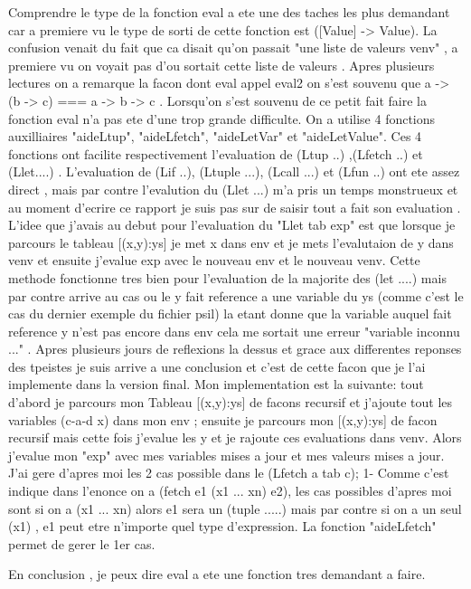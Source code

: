 \documentclass{article}
\begin{document}
Comprendre le type de la fonction eval a ete une des taches les plus demandant car a premiere vu le type de sorti de cette fonction est ([Value] -> Value). La confusion venait du fait que ca disait qu'on passait "une liste de valeurs venv" , a premiere vu on voyait pas d'ou sortait cette liste de valeurs . Apres plusieurs lectures on a remarque la facon dont eval appel eval2  on s'est souvenu que  a -> (b -> c)  === a -> b -> c . Lorsqu'on s'est souvenu de ce petit fait faire la fonction eval n'a pas ete d'une trop grande difficulte. On a utilise 4 fonctions auxilliaires  "aideLtup", "aideLfetch", "aideLetVar" et "aideLetValue". Ces 4 fonctions ont facilite respectivement l'evaluation de (Ltup ..) ,(Lfetch ..) et (Llet....) . L'evaluation de (Lif ..), (Ltuple ...), (Lcall ...) et (Lfun ..) ont ete assez direct , mais par contre l'evalution du (Llet ...) m'a pris un temps monstrueux et au moment d'ecrire ce rapport je suis pas sur de saisir tout a fait son evaluation . L'idee que j'avais au debut pour l'evaluation du "Llet tab exp" est que lorsque je parcours le tableau [(x,y):ys] je met x dans env et je mets l'evalutaion de y dans venv et ensuite j'evalue exp avec le nouveau env et le nouveau venv. Cette methode fonctionne tres bien pour l'evaluation de la majorite des (let ....) mais par contre arrive au cas ou le y fait reference a une variable du ys (comme c'est le cas du dernier exemple du fichier psil) la etant donne que la variable auquel fait reference y n'est pas encore dans env cela me sortait une erreur "variable inconnu ..." . Apres plusieurs jours de reflexions la dessus et grace aux differentes reponses des tpeistes je suis arrive a une conclusion et c'est de cette facon que je l'ai implemente dans la version final. Mon implementation est la suivante: tout d'abord je parcours mon Tableau [(x,y):ys] de facons recursif et j'ajoute tout les variables (c-a-d x) dans mon env ; ensuite je parcours mon [(x,y):ys] de facon recursif mais cette fois j'evalue les y et je rajoute ces evaluations dans venv. Alors j'evalue mon "exp" avec mes variables mises a jour et mes valeurs mises a jour.  
J'ai gere d'apres moi les 2 cas possible dans le (Lfetch a tab c); 1- Comme c'est indique dans l'enonce on a (fetch e1 (x1 ... xn) e2), les cas possibles d'apres moi sont si on a (x1 ... xn) alors e1 sera un (tuple .....) mais par contre si on a un seul (x1) , e1 peut etre n'importe quel type d'expression. La fonction "aideLfetch" permet de gerer le 1er cas.

En conclusion , je peux dire eval a ete une fonction tres demandant a faire.\vspace{.7 cm}
\end{document}
